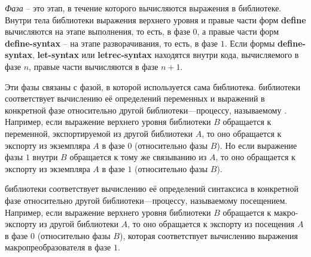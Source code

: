 %
\emph{Фаза} -- это этап, в течение которого вычисляются выражения в библиотеке. Внутри тела
библиотеки выражения верхнего уровня и правые части форм {\cf\bfseries define} вычисляются на
этапе выполнения, то есть, в фазе $0$, а правые части форм {\cf\bfseries define-syntax} -- на этапе
разворачивания, то есть, в фазе $1$. Если формы {\cf\bfseries define-syntax}, {\cf\bfseries
  let-syntax} или {\cf\bfseries letrec-syntax} находятся внутри кода, вычисляемого в фазе $n$,
правые части вычисляются в фазе $n+1$.

Эти фазы связаны с фазой, в которой используется сама библиотека. 
библиотеки соответствует вычислению её определений переменных и выражений в конкретной фазе
относительно другой библиотеки---процессу, называемому . Например,
если выражение верхнего уровня библиотеки $B$ обращается к переменной, экспортируемой из
другой библиотеки $A$, то оно обращается к экспорту из экземпляра $A$ в фазе $0$ (относительно
фазы $B$). Но если выражение фазы $1$ внутри $B$ обращается к тому же связыванию из
$A$, то оно обращается к экспорту из экземпляра $A$ в фазе $1$ (относительно фазы $B$).

 библиотеки соответствует вычислению её определений синтаксиса
в конкретной фазе относительно другой библиотеки---процессу, называемому 
{посещением}. Например, если выражение верхнего уровня библиотеки $B$ обращается к
макро-экспорту из другой библиотеки $A$, то оно обращается к экспорту из посещения
$A$ в фазе $0$ (относительно фазы $B$), которая соответствует вычислению выражения
макропреобразователя в фазе $1$.

